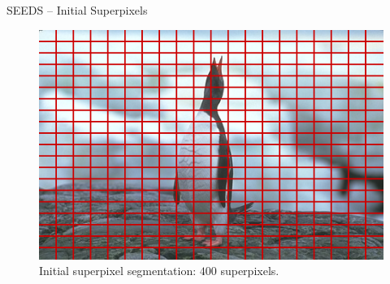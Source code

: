 \documentclass[handout]{beamer}
\begin{document}
%		
%		
%		
%		

%

	\begin{frame}{SEEDS -- Initial Superpixels}
		\begin{figure}
   			\centering
   			\includegraphics[scale=0.5]{images/bsd-2-level-4}
   			\caption{Initial superpixel segmentation: $400$ superpixels.}
   		\end{figure}
	\end{frame}
	
\end{document}
